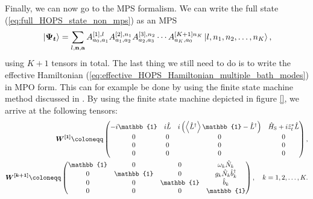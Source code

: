 Finally, we can now go to the MPS formalism. We can write the full state (\ref{eq:full_HOPS_state_non_mps}) as an MPS
\begin{equation*}
    \ket*{\vb*{\Psi_t}} = \sum_{l,\vb{n},\vb{a}} A_{a_0, a_1}^{[1], l} A_{a_1, a_2}^{[2], n_1} A_{a_2, a_3}^{[3], n_2} \cdots A_{a_K, a_0}^{[K+1] n_K} \ket*{l, n_1, n_2, \dots, n_{K}},
\end{equation*}
using $K+1$ tensors in total. The last thing we still need to do is to write the effective Hamiltonian (\ref{eq:effective_HOPS_Hamiltonian_multiple_bath_modes})
in MPO form. This can for example be done by using the finite state machine method discussed in \cite{Motruk:2016}. By using the finite state machine depicted
in figure \ref{}, we arrive at the following tensors:
\begin{equation}
    \label{eq:HOMPS_MPO}
    \begin{aligned}
        \vb*{W^{[1]}} \coloneqq
        \begin{pmatrix}
            -i\mathbb{1} & i\hat{L} & i\left(\left\langle \hat{L}^\dagger\right\rangle \mathbb{1} - \hat{L}^\dagger\right) & \hat{H}_\text{S} + i\tilde{z}_t^*\hat{L} \\
            0            & 0        & 0                                                                                    & 0                                        \\
            0            & 0        & 0                                                                                    & 0                                        \\
            0            & 0        & 0                                                                                    & 0                                        \\
        \end{pmatrix},\\
        \vb*{W^{[k+1]}} \coloneqq
        \begin{pmatrix}
            \mathbb{1} & 0          & 0          & \omega_k\hat{N}_k                \\
            0          & \mathbb{1} & 0          & g_k \hat{N}_k  \hat{b}_k^\dagger \\
            0          & 0          & \mathbb{1} & \hat{b}_k                        \\
            0          & 0          & 0          & \mathbb{1}                       \\
        \end{pmatrix}, \quad k = 1, 2, \dots, K.
    \end{aligned}
\end{equation}
